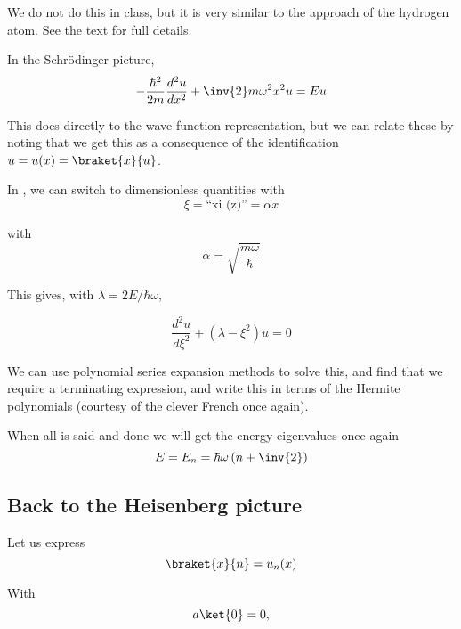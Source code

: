 We do not do this in class, but it is very similar to the approach of the hydrogen atom.  See the text for full details.

In the Schr\"{o}dinger picture,
\begin{equation}\label{eqn:PHY356FLecture11:400}
-\frac{\hbar^2}{2m} \frac{d^2 u}{dx^2} + \inv{2} m \omega^2 x^2 u = E u
\end{equation}

This does directly to the wave function representation, but we can relate these by noting that we get this as a consequence of the identification $u = u(x) = \braket{x}{u}$.

In , we can switch to dimensionless quantities with
\begin{equation}\label{eqn:PHY356FLecture11:410}
\xi = \text{``xi (z)''} = \alpha x
\end{equation}

with
\begin{equation}\label{eqn:PHY356FLecture11:411}
\alpha = \sqrt{\frac{m \omega}{\hbar}}
\end{equation}

This gives, with $\lambda = 2E/\hbar\omega$,

\begin{equation}\label{eqn:PHY356FLecture11:420}
\frac{d^2 u}{d\xi^2} + (\lambda - \xi^2) u = 0
\end{equation}

We can use polynomial series expansion methods to solve this, and find that we require a terminating expression, and write this in terms of the Hermite polynomials (courtesy of the clever French once again).

When all is said and done we will get the energy eigenvalues once again
\begin{equation}\label{eqn:PHY356FLecture11:430}
E = E_n = \hbar \omega \left( n + \inv{2} \right)
\end{equation}

\subsection{Back to the Heisenberg picture}

Let us express
\begin{equation}\label{eqn:PHY356FLecture11:500}
\braket{x}{n} = u_n(x)
\end{equation}

With
\begin{equation}\label{eqn:PHY356FLecture11:510}
a \ket{0} = 0,
\end{equation}

